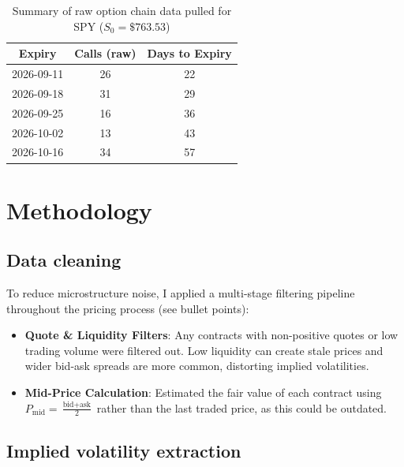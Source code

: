 \documentclass[11pt]{article}
\begin{document}
\begin{table}[h!]
\centering
\caption{Summary of raw option chain data pulled for SPY ($S_0 = \$763.53$)}
\label{tab:raw_data}
\begin{tabular}{ccc}
\toprule
\textbf{Expiry} & \textbf{Calls (raw)} & \textbf{Days to Expiry} \\
\midrule
2026-09-11 & 26 & 22 \\
2026-09-18 & 31 & 29 \\
2026-09-25 & 16 & 36 \\
2026-10-02 & 13 & 43 \\
2026-10-16 & 34 & 57 \\
\bottomrule
\end{tabular}
\end{table}

\newpage

\section{Methodology}

\subsection{Data cleaning}

To reduce microstructure noise, I applied a multi-stage filtering pipeline throughout the pricing process (see bullet points):

\begin{itemize}
    \item \textbf{Quote \& Liquidity Filters}: Any contracts with non-positive quotes or low trading volume were filtered out. Low liquidity can create stale prices and wider bid-ask spreads are more common, distorting implied volatilities.
    \item \textbf{Mid-Price Calculation}: Estimated the fair value of each contract using $P_{\text{mid}} = \frac{\text{bid} + \text{ask}}{2}$ rather than the last traded price, as this could be outdated.
\end{itemize}


\subsection{Implied volatility extraction}
\end{document}
